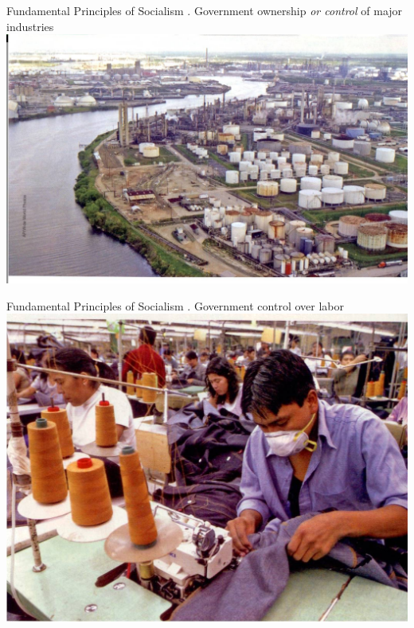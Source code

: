 \begin{frame}{Fundamental Principles of Socialism}
    . Government ownership \emph{or control} of major industries\\
    \includegraphics[width=.9\textwidth]{img/industries.jpg} \\
\end{frame}

\begin{frame}{Fundamental Principles of Socialism}
    . Government control over labor \\
    \includegraphics[width=.9\textwidth]{img/labor.jpg} \\
\end{frame}

